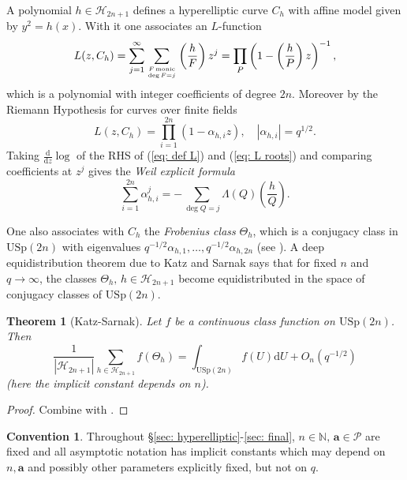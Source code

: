 \documentclass[alphabetic, 
        colorlinks,
        linkcolor=red,  citecolor=blue,
        backref
]{amsart}
\numberwithin{equation}{section}
\newtheorem{thm}{Theorem}
\theoremstyle{definition}
\newtheorem{conv}[claim]{Convention}
\newcommand{\N}{{\mathbb N}}
\newcommand{\USp}{{\mathrm{USp}}}
\begin{document}
A polynomial $h\in\mathcal H_{2n+1}$ defines a hyperelliptic curve $C_h$ with affine model given by $y^2=h(x)$. With it one associates an $L$-function
\begin{equation}\label{eq: def L}L(z,C_h)=\sum_{j=1}^\infty\sum_{F\,\mathrm{monic}\atop{\deg F=j}}\left(\frac hF\right)z^j=\prod_P\left(1-\left(\frac hP\right)z\right)^{-1},\end{equation}
which is a polynomial with integer coefficients of degree $2n$. Moreover by the Riemann Hypothesis for curves over finite fields
\begin{equation}\label{eq: L roots}L(z,C_h)=\prod_{i=1}^{2n}(1-\alpha_{h,i}z),\quad |\alpha_{h,i}|=q^{1/2}.\end{equation}
Taking $\frac{\mathrm d}{\mathrm dz}\log$ of the RHS of (\ref{eq: def L}) and (\ref{eq: L roots}) and comparing coefficients at $z^j$ gives the \emph{Weil explicit formula}
\begin{equation}\label{eq: weil exp}\sum_{i=1}^{2n}\alpha_{h,i}^j=-\sum_{\deg Q=j}\Lambda(Q)\left(\frac hQ\right).\end{equation}

One also associates with $C_h$ the \emph{Frobenius class} $\Theta_h$, which is a conjugacy class in $\USp(2n)$ with eigenvalues $q^{-1/2}\alpha_{h,1},\ldots,q^{-1/2}\alpha_{h,2n}$ (see \cite[9.2.4, 10.1.18.3, 9.1.16]{KaSa99}). 
A deep equidistribution theorem due to Katz and Sarnak says that for fixed $n$ and $q\to\infty$, the classes $\Theta_h,\,h\in\mathcal H_{2n+1}$ become equidistributed in the space of conjugacy classes of $\USp(2n)$.


\begin{thm}[Katz-Sarnak]\label{thm: katz-sarnak} Let $f$ be a continuous class function on $\USp(2n)$. Then $$\frac 1{|\mathcal H_{2n+1}|}\sum_{h\in\mathcal H_{2n+1}}f(\Theta_h)=\int_{\USp(2n)}f(U)\mathrm d U+O_n(q^{-1/2})$$
(here the implicit constant depends on $n$).
\end{thm}

\begin{proof} Combine \cite[Theorem 9.6.10]{KaSa99} with \cite[Theorem 10.1.18.3]{KaSa99}.\end{proof}

\begin{conv} Throughout \S\ref{sec: hyperelliptic}-\ref{sec: final}, $n\in\N,\,\mathbf a\in\mathcal P$ are fixed and all asymptotic notation has implicit constants which may depend on $n,\mathbf a$ and possibly other parameters explicitly fixed, but not on $q$.\end{conv}
\end{document}
